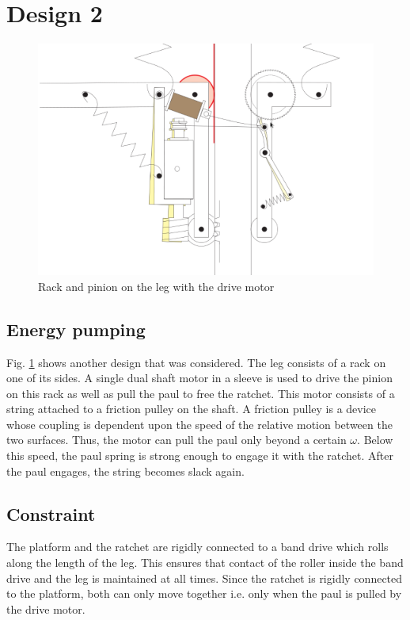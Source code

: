 \section{Design 2}
\begin{figure}[!h]
\centering
\includegraphics[scale=1.8]{fig/seth_design.pdf}
\caption{Rack and pinion on the leg with the drive motor}
\label{fig:3_seth_design}
\end{figure}

\subsection*{Energy pumping}
Fig. \ref{fig:3_seth_design} shows another design that was considered. The leg consists of a rack on one of its sides. A single dual shaft motor in a sleeve is used to drive the pinion
on this rack as
well as pull the paul to free the ratchet. This motor consists of a string attached to a friction pulley on the shaft.
A friction pulley is a device whose coupling is dependent upon the speed of the relative motion between the two surfaces.
Thus, the motor can pull the paul only beyond a certain $\omega$. Below this speed, the paul spring is strong enough to
engage it with the ratchet. After the paul engages, the string becomes slack again.

\subsection*{Constraint} 
The platform and the ratchet are rigidly connected to a band drive which rolls along
the length of the leg. This ensures that contact of the roller inside the band drive and the leg is maintained at all
times. Since the ratchet is rigidly connected to the platform, both can only move together i.e. only when the paul is
pulled by the drive motor. 

